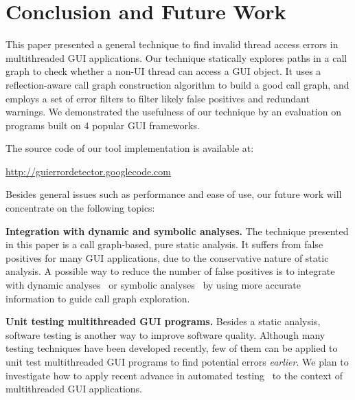 \smallstep
\section{Conclusion and Future Work}

This paper presented a general technique to find invalid
thread access errors in multithreaded GUI applications. 
Our technique statically explores paths in a call graph to check
whether a non-UI thread can access a GUI object.
It uses a reflection-aware call graph construction algorithm
to build a good call graph, and employs a set of error
filters to filter likely false positives and redundant warnings.
We demonstrated the usefulness of our technique
by an evaluation on \subnum programs built on 4 popular GUI
frameworks. 

The source code of our tool implementation is available at:


\noindent \url{http://guierrordetector.googlecode.com}


\vspace{1mm}


Besides general issues such as performance and ease of use, our future
work will concentrate on the following topics:

\textbf{Integration with dynamic and symbolic analyses.} The technique 
presented in this paper is a call graph-based, pure static analysis. 
It suffers from false positives for many GUI applications,
due to the conservative nature of static analysis.
A possible way to reduce the number of false
positives is to integrate with
dynamic analyses~\cite{Jiang:2008:PPS:1453101.1453110}
or symbolic analyses~\cite{xie05:symstra, Pasareanu:2011, halfond09issta, BMF97}
by using more accurate information to guide call graph exploration.

\textbf{Unit testing multithreaded GUI programs.} Besides
a static analysis,  software testing is another
way to improve software quality.  Although many
testing techniques have been developed recently, few of them can be applied
to unit test multithreaded GUI programs to find potential errors \textit{earlier}. We
plan to investigate how to apply recent advance in automated
testing~\cite{Staats:2011:PTO:1985793.1985847, Jagannath:2011:IMU:2025113.2025145, Muccini_Bertolino_Inverardi_2004, Ricca:2001:ATW:381473.381476, Harman:2007}
to the context of multithreaded GUI applications.


